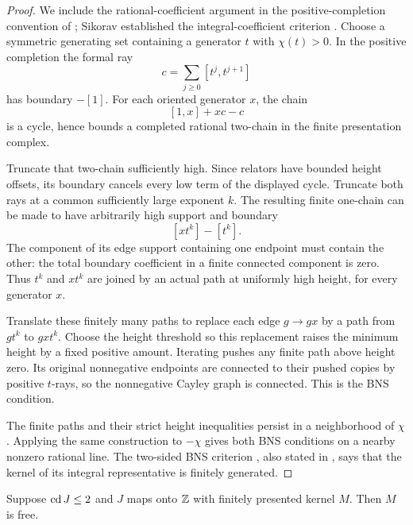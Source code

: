 \begin{proof}
We include the rational-coefficient argument in the positive-completion
convention of \cite[Theorem~3.11]{Kielak2020}; Sikorav established the
integral-coefficient criterion \cite{Sikorav1987}.
Choose a symmetric generating set containing a generator \(t\)
with \(\chi(t)>0\).  In the positive completion the formal ray
\[
 c=\sum_{j\ge0}[t^j,t^{j+1}]
\]
has boundary \(-[1]\).  For each oriented generator \(x\), the
chain
\[
 [1,x]+xc-c
\]
is a cycle, hence bounds a completed rational two-chain in the
finite presentation complex.

Truncate that two-chain sufficiently high.  Since relators have
bounded height offsets, its boundary cancels every low term of
the displayed cycle.  Truncate both rays at a common sufficiently
large exponent \(k\).  The resulting finite one-chain can be
made to have arbitrarily high support and boundary
\[
 [xt^k]-[t^k].
\]
The component of its edge support containing one endpoint must
contain the other: the total boundary coefficient in a finite
connected component is zero.  Thus \(t^k\) and \(xt^k\) are joined
by an actual path at uniformly high height, for every generator
\(x\).

Translate these finitely many paths to replace each edge
\(g\to gx\) by a path from \(gt^k\) to \(gxt^k\).
Choose the height threshold so this replacement raises the
minimum height by a fixed positive amount.  Iterating pushes
any finite path above height zero.  Its original nonnegative
endpoints are connected to their pushed copies by positive
\(t\)-rays, so the nonnegative Cayley graph is connected.
This is the BNS condition.

The finite paths and their strict height inequalities persist
in a neighborhood of \(\chi\).  Applying the same construction
to \(-\chi\) gives both BNS conditions on a nearby nonzero
rational line.  The two-sided BNS criterion
\cite[Theorem~B1]{BNS1987}, also stated in
\cite[Theorem~3.10]{Kielak2020}, says that the kernel of its integral representative
is finitely generated.
\end{proof}

\begin{lemma}\label{fill:free-kernel}
Suppose \(\operatorname{cd} J\le2\) and \(J\) maps onto \(\mathbb Z\) with finitely
presented kernel \(M\).  Then \(M\) is free.
\end{lemma}

